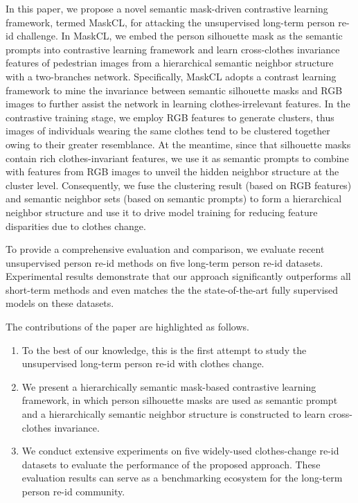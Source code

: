 \documentclass[10pt,twocolumn,letterpaper]{article}
\newcommand{\reid}{re-id}
\newcommand{\sota}{the state-of-the-art}
\begin{document}
{
In this paper, we propose a novel semantic mask-driven contrastive learning framework, termed MaskCL, for attacking the unsupervised long-term person re-id challenge. 
In MaskCL, we embed the person silhouette mask as the semantic prompts into contrastive learning framework and learn cross-clothes invariance features of pedestrian images from a hierarchical semantic neighbor structure with a two-branches network.  
Specifically, MaskCL adopts a contrast learning framework to mine the invariance between semantic silhouette masks and RGB images to further assist the network in learning clothes-irrelevant features.
In the contrastive training stage, we employ RGB features to generate clusters, thus images of individuals wearing the same clothes tend to be clustered together owing to their greater resemblance.
At the meantime, since that silhouette masks contain rich clothes-invariant features, we use it as semantic prompts to combine with features from RGB images to unveil the hidden neighbor structure at the cluster level. 
Consequently, we fuse the clustering result (based on RGB features) and semantic neighbor sets (based on semantic prompts) to form a hierarchical neighbor structure and use it to drive model training for reducing feature disparities due to clothes change.
}

{
To provide a comprehensive evaluation and comparison, we evaluate recent unsupervised person re-id methods on five long-term person re-id datasets. Experimental results demonstrate that our approach significantly outperforms all short-term methods and even matches the  \sota{} fully supervised models on these datasets.
}



{
The contributions of the paper are highlighted as follows.
\begin{enumerate}
\item
To the best of our knowledge, this is the first attempt to study the unsupervised long-term person re-id with clothes change. 

\item 
We present a hierarchically semantic mask-based contrastive learning framework, in which person silhouette masks  are used as semantic prompt and a hierarchically semantic neighbor structure is constructed to learn cross-clothes invariance.
\item 
We conduct extensive experiments on five widely-used clothes-change \reid{} datasets to evaluate the performance of the proposed approach. 
These evaluation results can serve as a benchmarking ecosystem for the long-term person \reid{} community. \end{enumerate}
}
\end{document}
